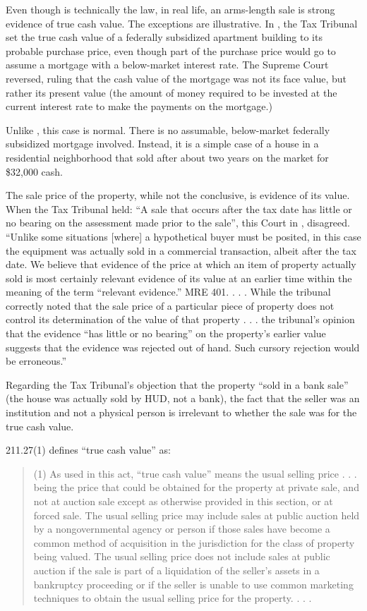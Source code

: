 \documentclass[12pt,\documentclassflag]{michiganCourtOfAppealsBrief}
\begin{document}
{Even though  is technically the law, in real life, an arms-length sale is strong evidence of true cash value. The exceptions are illustrative. In \cite[s]{Antisdale}, the Tax Tribunal set the true cash value of a federally subsidized apartment building to its probable purchase price, even though part of the purchase price would go to assume a mortgage with a below-market interest rate. The Supreme Court reversed, ruling that the cash value of the mortgage was not its face value, but rather its present value (the amount of money required to be invested at the current interest rate to make the payments on the mortgage.) 

Unlike \cite[s]{Antisdale}, this case is normal. There is no assumable, below-market federally subsidized mortgage involved. Instead, it is a simple case of a house in a residential neighborhood that sold after about two years on the market for \$32,000 cash.

The sale price of the property, while not the conclusive, is evidence of its value. When the Tax Tribunal held: ``A sale that occurs after the tax date has little or no bearing on the assessment made prior to the sale'', this Court in , disagreed. ``Unlike some situations [where] a hypothetical buyer must be posited, in this case the equipment was actually sold in a commercial transaction, albeit after the tax date. We believe that evidence of the price at which an item of property actually sold is most certainly relevant evidence of its value at an earlier time within the meaning of the term ``relevant evidence.'' MRE 401. . . . While the tribunal correctly noted that the sale price of a particular piece of property does not control its determination of the value of that property . . . the tribunal's opinion that the evidence ``has little or no bearing'' on the property's earlier value suggests that the evidence was rejected out of hand. Such cursory rejection would be erroneous.''

Regarding the Tax Tribunal's objection that the property ``sold in a bank sale'' (the house was actually sold by HUD, not a bank), the fact that the seller was an institution and not a physical person is irrelevant to whether the sale was for the true cash value.

\cite{MCL}{211.27(1)} defines ``true cash value'' as:

\begin{quote}
  (1) As used in this act, ``true cash value'' means the usual selling price . . . being the price that could be obtained for the property at private sale, and not at auction sale except as otherwise provided in this section, or at forced sale. The usual selling price may include sales at public auction held by a nongovernmental agency or person if those sales have become a common method of acquisition in the jurisdiction for the class of property being valued. The usual selling price does not include sales at public auction if the sale is part of a liquidation of the seller's assets in a bankruptcy proceeding or if the seller is unable to use common marketing techniques to obtain the usual selling price for the property. . . . 
\end{quote}

}
\end{document}
